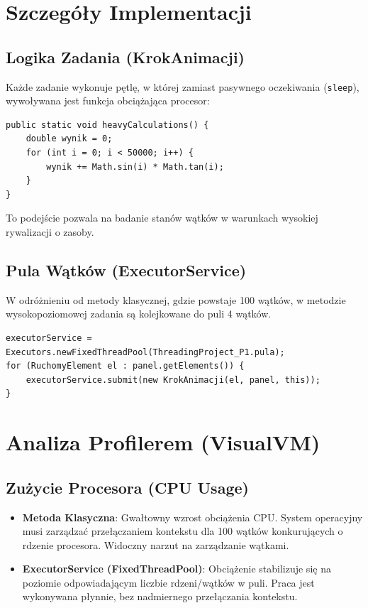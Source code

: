 \documentclass[11pt,a4paper]{article}
\begin{document}
\section{Szczegóły Implementacji}

\subsection{Logika Zadania (KrokAnimacji)}
Każde zadanie wykonuje pętlę, w której zamiast pasywnego oczekiwania (\texttt{sleep}), wywoływana jest funkcja obciążająca procesor:
\begin{lstlisting}
public static void heavyCalculations() {
    double wynik = 0;
    for (int i = 0; i < 50000; i++) {
        wynik += Math.sin(i) * Math.tan(i);
    }
}
\end{lstlisting}
To podejście pozwala na badanie stanów wątków w warunkach wysokiej rywalizacji o zasoby.

\subsection{Pula Wątków (ExecutorService)}
W odróżnieniu od metody klasycznej, gdzie powstaje 100 wątków, w metodzie wysokopoziomowej zadania są kolejkowane do puli 4 wątków.
\begin{lstlisting}
executorService = Executors.newFixedThreadPool(ThreadingProject_P1.pula);
for (RuchomyElement el : panel.getElements()) {
    executorService.submit(new KrokAnimacji(el, panel, this));
}
\end{lstlisting}

\section{Analiza Profilerem (VisualVM)}

\subsection{Zużycie Procesora (CPU Usage)}
\begin{itemize}
    \item \textbf{Metoda Klasyczna}: Gwałtowny wzrost obciążenia CPU. System operacyjny musi zarządzać przełączaniem kontekstu dla 100 wątków konkurujących o rdzenie procesora. Widoczny narzut na zarządzanie wątkami.
    \item \textbf{ExecutorService (FixedThreadPool)}: Obciążenie stabilizuje się na poziomie odpowiadającym liczbie rdzeni/wątków w puli. Praca jest wykonywana płynnie, bez nadmiernego przełączania kontekstu.
\end{itemize}
\end{document}
